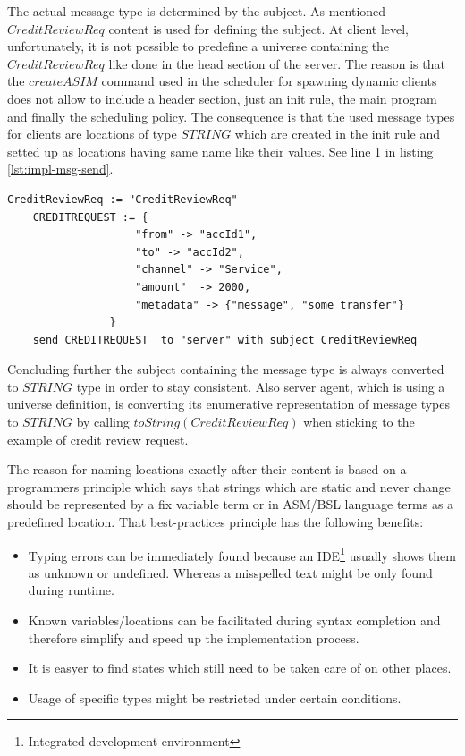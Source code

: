 The actual message type is determined by the subject. As mentioned $CreditReviewReq$ content is used for defining the subject. At client level, unfortunately, it is not possible to predefine a universe containing the $CreditReviewReq$ like done in the head section of the server. The reason is that the $createASIM$ command used in the scheduler for spawning dynamic clients does not allow to include a header section, just an init rule, the main program and finally the scheduling policy. The consequence is that the used message types for clients are locations of type $STRING$ which are created in the init rule and setted up as locations having same name like their values. See line 1 in listing \ref{lst:impl-msg-send}.

\begin{center}
\begin{minipage}{0.8\textwidth}
\small
\begin{lstlisting}[language=bsl_lst,caption={\bf\small send message},label={lst:impl-msg-send} ]
	CreditReviewReq := "CreditReviewReq"
	CREDITREQUEST := {
					"from" -> "accId1",
					"to" -> "accId2",
					"channel" -> "Service",
					"amount"  -> 2000,
					"metadata" -> {"message", "some transfer"}
				}
	send CREDITREQUEST  to "server" with subject CreditReviewReq
\end{lstlisting}
\end{minipage}
\end{center}

Concluding further the subject containing the message type is always converted to $STRING$ type in order to stay consistent. Also server agent, which is using a universe definition, is converting its enumerative representation of message types to $STRING$ by calling $toString(CreditReviewReq)$ when sticking to the example of credit review request.

The reason for naming locations exactly after their content is based on a programmers principle which says that strings which are static and never change should be represented by a fix variable term or in ASM/BSL language terms as a predefined location. That best-practices principle has the following benefits:

\begin{itemize}
	\item Typing errors can be immediately found because an IDE\footnote{Integrated development environment} usually shows them as unknown or undefined. Whereas a misspelled text might be only found during runtime.
	\item Known variables/locations can be facilitated during syntax completion and therefore simplify and speed up the implementation process.
	\item It is easyer to find states which still need to be taken care of on other places.
	\item Usage of specific types might be restricted under certain conditions.
\end{itemize}

